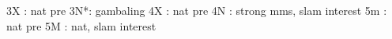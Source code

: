 3X : nat pre
3N*: gambaling
4X : nat pre
4N : strong mms, slam interest
5m : nat pre
5M : nat, slam interest
